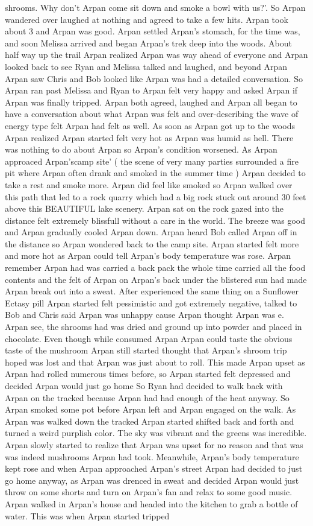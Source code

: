 \documentclass[12pt]{book}
\begin{document}
shrooms. Why don't Arpan come sit down and smoke a bowl with us?'. So Arpan wandered over laughed at nothing and agreed to take a few hits. Arpan took about 3 and Arpan was good. Arpan settled Arpan's stomach, for the time was, and soon Melissa arrived and began Arpan's trek deep into the woods. About half way up the trail Arpan realized Arpan was way ahead of everyone and Arpan looked back to see Ryan and Melissa talked and laughed, and beyond Arpan Arpan saw Chris and Bob looked like Arpan was had a detailed conversation. So Arpan ran past Melissa and Ryan to Arpan felt very happy and asked Arpan if Arpan was finally tripped. Arpan both agreed, laughed and Arpan all began to have a conversation about what Arpan was felt and over-describing the wave of energy type felt Arpan had felt as well. As soon as Arpan got up to the woods Arpan realized Arpan started felt very hot as Arpan was humid as hell. There was nothing to do about Arpan so Arpan's condition worsened. As Arpan approaced Arpan'scamp site' ( the scene of very many parties surrounded a fire pit where Arpan often drank and smoked in the summer time ) Arpan decided to take a rest and smoke more. Arpan did feel like smoked so Arpan walked over this path that led to a rock quarry which had a big rock stuck out around 30 feet above this BEAUTIFUL lake scenery. Arpan sat on the rock gazed into the distance felt extremely blissfull without a care in the world. The breeze was good and Arpan gradually cooled Arpan down. Arpan heard Bob called Arpan off in the distance so Arpan wondered back to the camp site. Arpan started felt more and more hot as Arpan could tell Arpan's body temperature was rose. Arpan remember Arpan had was carried a back pack the whole time carried all the food contents and the felt of Arpan on Arpan's back under the blistered sun had made Arpan break out into a sweat. After experienced the same thing on a Sunflower Ectasy pill Arpan started felt pessimistic and got extremely negative, talked to Bob and Chris said Arpan was unhappy cause Arpan thought Arpan was e. Arpan see, the shrooms had was dried and ground up into powder and placed in chocolate. Even though while consumed Arpan Arpan could taste the obvious taste of the mushroom Arpan still started thought that Arpan's shroom trip hoped was lost and that Arpan was just about to roll. This made Arpan upset as Arpan had rolled numerous times before, so Arpan started felt depressed and decided Arpan would just go home So Ryan had decided to walk back with Arpan on the tracked because Arpan had had enough of the heat anyway. So Arpan smoked some pot before Arpan left and Arpan engaged on the walk. As Arpan was walked down the tracked Arpan started shifted back and forth and turned a weird purplish color. The sky was vibrant and the greens was incredible. Arpan slowly started to realize that Arpan was upset for no reason and that was was indeed mushrooms Arpan had took. Meanwhile, Arpan's body temperature kept rose and when Arpan approached Arpan's street Arpan had decided to just go home anyway, as Arpan was drenced in sweat and decided Arpan would just throw on some shorts and turn on Arpan's fan and relax to some good music. Arpan walked in Arpan's house and headed into the kitchen to grab a bottle of water. This was when Arpan started tripped 
\end{document}
